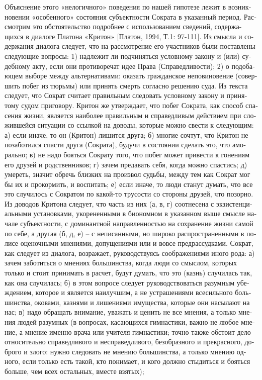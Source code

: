 \begin{russian}
    Объяснение этого «нелогичного» поведения по нашей гипотезе лежит в возникновении «особенного» состояния субъектности Сократа в указанный период. Рассмотрим это обстоятельство подробнее с использованием сведений, содержащихся в диалоге Платона «Критон» [Платон, 1994, Т.1: 97-111]. 
    Из смысла и содержания диалога следует, что на рассмотрение его участников были поставлены следующие вопросы: 1) надлежит ли подчиняться условному закону и (или) судебному акту, если они противоречат идее Права (Справедливости); 2) о подобающем выборе между альтернативами: оказать гражданское неповиновение (совершить побег из тюрьмы) или принять смерть согласно решению суда.
    Из текста следует, что Сократ считает правильным следовать условному закону и принятому судом приговору.
    Критон же утверждает, что побег Сократа, как способ спасения жизни, является наиболее правильным и справедливым действием при сложившейся ситуации со ссылкой на доводы, которые можно свести к следующим:
    а) если иначе, то он (Критон) лишится друга;
    б) многие сочтут, что Критон не позаботился спасти друга (Сократа), будучи в состоянии сделать это, что аморально;
    в) не надо бояться Сократу того, что побег может привести к гонениям его друзей и родственников;
    г) зачем предавать себя, когда можно спастись;
    д) умереть, значит обречь близких на произвол судьбы, между тем как Сократ мог бы их и прокормить, и воспитать;
    е) если иначе, то люди станут думать, что все это случилось с Сократом по какой-то трусости со стороны друзей, что позорно.
    Из доводов Критона следует, что часть из них (а, в, г) соотнесена с экзистенциальными установками, укорененными в биономном в указанном выше смысле начале субъектности, с доминантной направленностью на сохранение жизни самой по себе, а другая (б, д, е) – с неписанными, но широко распространенными в полисе оценочными мнениями, допущениями или и вовсе предрассудками. 
    Сократ, как следует из диалога, возражает, руководствуясь соображениями иного рода:
    а) зачем заботиться о мнениях большинства, когда люди со смыслом, которых только и стоит принимать в расчет, будут думать, что это (казнь) случилась так, как она случилась; 
    б) в этом вопросе следует руководствоваться разумным убеждением, которое и является наилучшим, а не устрашениями всесильного большинства, оковами, казнями и лишениями имущества, которые они насылают на нас;
    в) надо обращать внимание, уважать и ценить  не все мнения, а только  мнения людей разумных (в вопросах, касающихся гимнастики, важно не любое мнение, а мнение именно врача или учителя гимнастики; точно также обстоит дело относительно справедливого и несправедливого, безобразного и прекрасного, доброго и злого: нужно следовать не мнению большинства, а только мнению одного, если только есть такой, кто понимает, и кого должно стыдиться и бояться больше, чем всех остальных, вместе взятых);

\end{russian}
